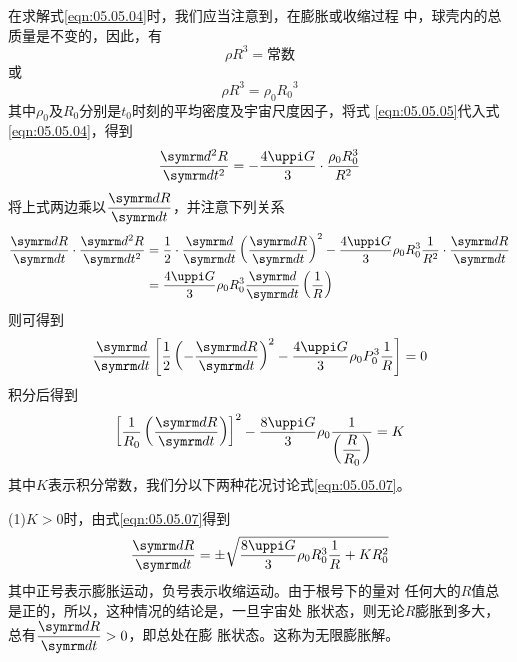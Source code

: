 在求解式\eqref{eqn:05.05.04}时，我们应当注意到，在膨胀或收缩过程
中，球壳内的总质量是不变的，因此，有
\begin{equation*}
 \rho R ^ { 3 } = \text{常数}
\end{equation*}
或\vspace{-0.6em}
\begin{equation}\label{eqn:05.05.05}
 \rho R ^ { 3 } = \rho _ 0 { R _ 0} ^ { 3 }
\end{equation}
其中$ \rho _ { 0 } $及$ R _ 0 $分别是$ t _ { 0 } $时刻的平均密度及宇宙尺度因子，将式
\eqref{eqn:05.05.05}代入式\eqref{eqn:05.05.04}，得到
\begin{equation}\label{eqn:05.05.06}
 \frac { \dif ^ { 2 } R } { \dif t ^ { 2 } } = - \frac { 4 \uppi G } { 3 } \cdot \frac { \rho _ { 0 } R _ { 0 } ^ { 3 } } { R ^ { 2 } }
\end{equation}
将上式两边乘以$ \dfrac { \dif R } { \dif t } $，并注意下列关系
\begin{equation*}
 \begin{aligned}
 \frac { \dif R } { \dif t } \cdot \frac { \dif ^ { 2 } R } { \dif t ^ { 2 } }
 &= \frac { 1 } { 2 } \cdot \frac { \dif } { \dif t } \left( \frac { \dif R } { \dif t } \right) ^ { 2 } - \frac { 4 \uppi G } { 3 } \rho _ { 0 } R _ { 0 } ^ { 3 } \frac { 1 } { R ^ { 2 } } \cdot \frac { \dif R } { \dif t } \\
 &= \frac { 4 \uppi G } { 3 } \rho _ { 0 } R _ 0 ^ { 3 } \frac { \dif } { \dif t } \left( \frac { 1 } { R } \right)
 \end{aligned}
\end{equation*}
则可得到
\begin{equation*}
 \frac { \dif } { \dif t } \left[ \frac { 1 } { 2 } \left( - \frac { \dif R } { \dif t } \right) ^ { 2 } - \frac { 4 \uppi G } { 3 } \rho _ { 0 } P _ { 0 } ^ { 3 } \frac { 1 } { R } \right] = 0
\end{equation*}
积分后得到
\begin{equation}\label{eqn:05.05.07}
 \left[ \frac { 1 } { R _ { 0 } } \left( \frac { \dif R } { \dif t } \right) \right] ^ { 2 } - \frac { 8 \uppi G } { 3 } \rho _ 0 \frac { 1 } {\left( \dfrac { R } { R _ { 0 } }\right)} = K
\end{equation}
其中$ K $表示积分常数，我们分以下两种花况讨论式\eqref{eqn:05.05.07}。

(1)$ K > 0 $时，由式\eqref{eqn:05.05.07}得到
\begin{equation}\label{eqn:05.05.08}
 \frac { \dif R } { \dif t } = \pm \sqrt { \frac { 8 \uppi G } { 3 } \rho _ { 0 } R _ { 0 } ^ { 3 } \frac { 1 } { R } + K R _ 0 ^ { 2 } }
\end{equation}
其中正号表示膨胀运动，负号表示收缩运动。由于根号下的量对
任何大的$ R $值总是正的，所以，这种情况的结论是，一旦宇宙处
胀状态，则无论$ R $膨胀到多大，总有$ \dfrac { \dif R } { \dif t } > 0 $，即总处在膨
胀状态。这称为无限膨胀解。

